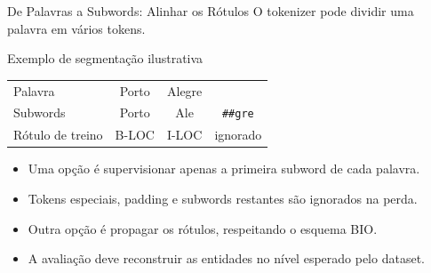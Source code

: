 \documentclass[aspectratio=169, xcolor=dvipsnames]{beamer}
\begin{document}
  \begin{frame}{De Palavras a Subwords: Alinhar os Rótulos}
    O tokenizer pode dividir uma palavra em vários tokens.
    \begin{block}{Exemplo de segmentação ilustrativa}
      \centering
      \begin{tabular}{lccc}
        \toprule
        Palavra & Porto & Alegre & \\
        Subwords & Porto & Ale & \texttt{\#\#gre} \\
        Rótulo de treino & B-LOC & I-LOC & ignorado \\
        \bottomrule
      \end{tabular}
    \end{block}
    \begin{itemize}
      \item Uma opção é supervisionar apenas a primeira subword de cada palavra.
      \item Tokens especiais, padding e subwords restantes são ignorados na perda.
      \item Outra opção é propagar os rótulos, respeitando o esquema BIO.
      \item A avaliação deve reconstruir as entidades no nível esperado pelo dataset.
    \end{itemize}
  \end{frame}
\end{document}
